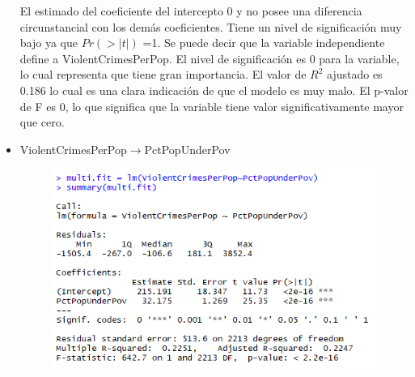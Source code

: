 \documentclass[a4paper,10pt,twocolumn]{article}
\begin{document}
\begin{itemize}
	El estimado del coeficiente del intercepto 0 y no posee una diferencia circunstancial con los demás coeficientes. Tiene un nivel de significación muy bajo ya que $Pr(> | t | )$ =1.
	Se puede decir que la variable independiente define a ViolentCrimesPerPop. El nivel de significación es 0 para la variable, lo cual representa que tiene gran importancia. El valor de $R^2$ ajustado es 0.186 lo cual es una clara indicación de que el modelo es muy malo. El p-valor de F es 0, lo que significa que la variable tiene valor significativamente mayor que cero.

	\item {ViolentCrimesPerPop$\rightarrow$PctPopUnderPov}






		\begin{figure}[H]
			\begin{center}
				\includegraphics[width=.92\columnwidth,right]{figures/multifit4.png}
			\end{center}
		\end{figure}


\end{itemize}
\end{document}
